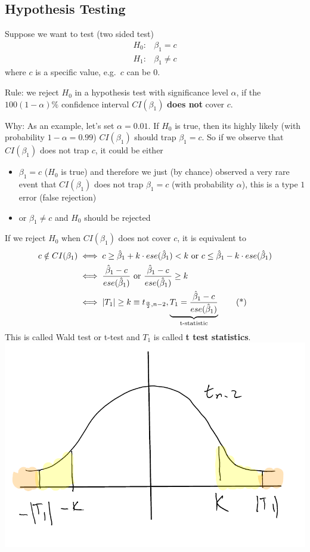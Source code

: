 \documentclass[12 pt]{article}
\begin{document}
    \subsection{Hypothesis Testing}
    Suppose we want to test (two sided test)
    \begin{align*}
      H_0: & \beta_1 = c
      \\ H_1: & \beta_1 \neq c
    \end{align*}
    where $c$ is a specific value, e.g.\ $c$ can be $0$.

    Rule: we reject $H_0$ in a hypothesis test with significance level
    $\alpha$, if the $100(1- \alpha)\%$ confidence interval
    $CI(\beta_1)$ \textbf{does not} cover $c$.

    Why: As an example, let's set $\alpha = 0.01$. If $H_0$ is true,
    then its highly likely (with probability $1 - \alpha = 0.99$)
    $CI(\beta_1)$ should trap $\beta_1 = c$. So if we observe that
    $CI(\beta_1)$ does not trap $c$, it could be either
    \begin{itemize}
    \item $\beta_1 = c$ ($H_0$ is true) and therefore we just (by
      chance) observed a very rare event that $CI(\beta_1)$ does not
      trap $\beta_1 = c$ (with probability $\alpha$), this is a type
      $1$ error (false rejection)
    \item or $\beta_1 \neq c$ and $H_0$ should be rejected
    \end{itemize}
    If we reject $H_0$ when $CI(\beta_1)$ does not cover $c$, it is
    equivalent to
    \begin{align*}
      c \notin CI(\beta_1) & \iff c \geq \hat{\beta}_1 + k \cdot
                          ese(\hat{\beta}_1) < k \text{ or } c \leq \hat{\beta}_1 - k \cdot ese (\hat{\beta}_1)
      \\ & \iff \frac{\hat{\beta}_1 - c}{ese(\hat{\beta}_1)} \text{ or
           } \frac{\hat{\beta}_1 - c }{ese(\hat{\beta}_1)} \geq k
      \\ & \iff |T_1| \geq k \equiv t_{\frac{\alpha}{2}, n-2}, \underbrace{T_1 = \frac{\hat{\beta}_1 - c }{ese(\hat{\beta}_1)}}_{\text{t-statistic}} \stepcounter{equation}\tag{*}\label{eq:1}
    \end{align*}
    This is called Wald test or t-test and $T_1$ is called \textbf{t
      test statistics}.
    \\
    \includegraphics[width=.6\textwidth]{16.pdf}
\end{document}
